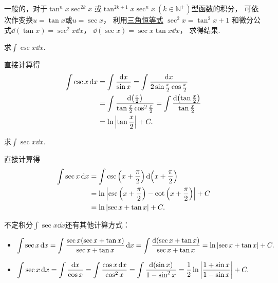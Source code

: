 \begin{remark}
一般的，对于\(\tan^n x \sec^{2k} x\)
或\(\tan^{2k+1} x \sec^n x\ (k \in \mathbb{N}^+)\)型函数的积分，
可依次作变换\(u=\tan x\)或\(u=\sec x\)，
利用\hyperref[equation:三角函数.毕达哥拉斯三角恒等式2]{三角恒等式}
\(\sec^2 x = \tan^2 x + 1\)
和微分公式\(\dd(\tan x) = \sec^2 x \dd{x}\)，
\(\dd(\sec x) = \sec x \tan x \dd{x}\)，
求得结果.
\end{remark}

\begin{example}
求\(\int \csc x \dd{x}\).
\begin{solution}
直接计算得
\begin{align*}
	\int \csc x \dd{x}
	&= \int \frac{\dd{x}}{\sin x}
	= \int \frac{\dd{x}}{2 \sin\frac{x}{2} \cos\frac{x}{2}} \\
	&= \int \frac{\dd(\frac{x}{2})}{\tan\frac{x}{2} \cos^2\frac{x}{2}}
	= \int \frac{\dd(\tan\frac{x}{2})}{\tan\frac{x}{2}} \\
	&= \ln\abs{\tan\frac{x}{2}} + C.
\end{align*}
\end{solution}
\end{example}

\begin{example}
求\(\int \sec x \dd{x}\).
\begin{solution}
直接计算得\begin{align*}
	\int \sec x \dd{x}
	&= \int \csc\left(x+\frac\pi2\right) \dd(x+\frac\pi2) \\
	&= \ln\abs{\csc\left(x+\frac\pi2\right)-\cot\left(x+\frac\pi2\right)} + C \\
	&= \ln\abs{\sec x+\tan x} + C.
\end{align*}
\end{solution}
\end{example}
\begin{remark}
不定积分\(\int \sec x \dd{x}\)还有其他计算方式：
\begin{itemize}
	\item \(\begin{aligned}[t]
		\int \sec x \dd{x}
		= \int \frac{\sec x (\sec x + \tan x)}{\sec x + \tan x} \dd{x}
		= \int \frac{\dd(\sec x + \tan x)}{\sec x + \tan x}
		= \ln\abs{\sec x + \tan x} + C.
	\end{aligned}\)

	\item \(\begin{aligned}[t]
		\int \sec x \dd{x}
		= \int \frac{\dd{x}}{\cos x}
		= \int \frac{\cos x \dd{x}}{\cos^2x}
		= \int \frac{\dd(\sin x)}{1 - \sin^2x}
		= \frac12 \ln\abs{\frac{1+\sin x}{1-\sin x}} + C.
	\end{aligned}\)
\end{itemize}
\end{remark}


